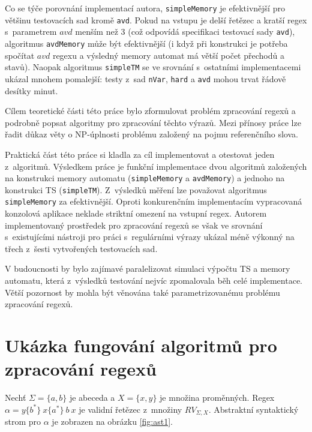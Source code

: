 \documentclass[thesis=B,czech]{FITthesis}[2019/12/23]
\theoremstyle{definition}
\begin{document}
Co se týče porovnání implementací autora, \texttt{simpleMemory} je efektivnější pro většinu testovacích sad kromě \texttt{avd}. Pokud na vstupu je delší řetězec a kratší regex s~parametrem $avd$ menším než 3 (což odpovídá specifikaci testovací sady \texttt{avd}), algoritmus \texttt{avdMemory} může být efektivnější (i když při konstrukci je potřeba spočítat $avd$ regexu a výsledný memory automat má větší počet přechodů a stavů). Naopak algoritmus \texttt{simpleTM} se ve srovnání s~ostatními implementacemi ukázal mnohem pomalejší: testy z~sad \texttt{nVar}, \texttt{hard} a \texttt{avd} mohou trvat řádově desítky minut.

\begin{conclusion}
Cílem teoretické části této práce bylo zformulovat problém zpracování regexů a podrobně popsat algoritmy pro zpracování těchto výrazů.  
Mezi přínosy práce lze řadit důkaz věty o NP-úplnosti problému založený na pojmu referenčního slova.

Praktická část této práce si kladla za cíl implementovat a otestovat jeden z~algoritmů. Výsledkem práce je funkční implementace dvou algoritmů založených na konstrukci memory automatu (\texttt{simpleMemory} a \texttt{avdMemory}) a jednoho na konstrukci TS (\texttt{simpleTM}). Z~výsledků měření lze považovat algoritmus \texttt{simpleMemory} za efektivnější. Oproti konkurenčním implementacím vypracovaná konzolová aplikace neklade striktní omezení na vstupní regex.  Autorem implementovaný prostředek pro zpracování regexů se však ve srovnání s~existujícími nástroji pro práci s~regulárními výrazy ukázal méně výkonný na třech z~šesti vytvořených testovacích sad.

V budoucnosti by bylo zajímavé paralelizovat simulaci výpočtu TS a memory automatu, která z~výsledků testování nejvíc zpomalovala běh celé implementace. Větší pozornost by mohla být věnována také parametrizovanému problému zpracování regexů.  

\end{conclusion}




\appendix

\chapter{Ukázka fungování algoritmů pro zpracování regexů}
Nechť $\Sigma = \{a, b\}$ je abeceda a $X = \{x, y\}$ je množina proměnných. Regex $\alpha = y\{b^\ast\} \ x\{a^\ast\} \ b \ x$ je validní řetězec z~množiny $RV_{\Sigma, X}$. Abstraktní syntaktický strom pro $\alpha$ je zobrazen na obrázku \ref{fig:ast1}.
\end{document}
